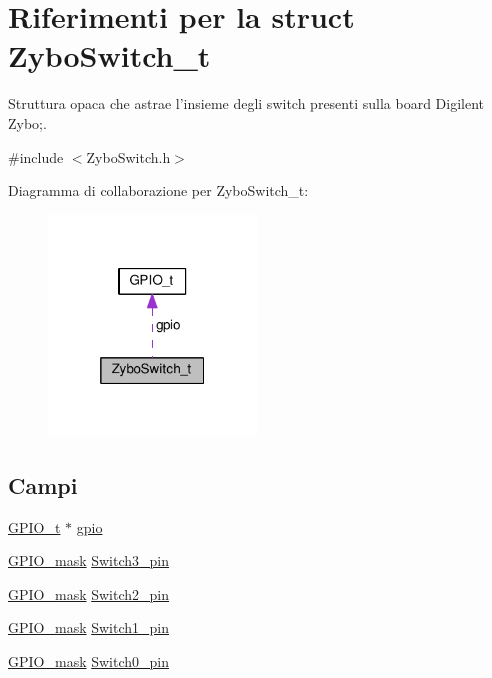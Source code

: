 \hypertarget{struct_zybo_switch__t}{\section{Riferimenti per la struct Zybo\+Switch\+\_\+t}
\label{struct_zybo_switch__t}
}


Struttura opaca che astrae l'insieme degli switch presenti sulla board Digilent Zybo;.  




{\ttfamily \#include $<$Zybo\+Switch.\+h$>$}



Diagramma di collaborazione per Zybo\+Switch\+\_\+t\+:\nopagebreak
\begin{figure}[H]
\begin{center}
\leavevmode
\includegraphics[width=157pt]{struct_zybo_switch__t__coll__graph}
\end{center}
\end{figure}
\subsection*{Campi}
\begin{DoxyCompactItemize}
\item 
\hyperlink{struct_g_p_i_o__t}{G\+P\+I\+O\+\_\+t} $\ast$ \hyperlink{struct_zybo_switch__t_acb3116190992a4d8d26545c103304d27}{gpio}
\item 
\hyperlink{group___g_p_i_o_ga6d5aef8a8a54ee2f602d47252ff66595}{G\+P\+I\+O\+\_\+mask} \hyperlink{struct_zybo_switch__t_a6b95420b88fe8c1fd7f347ce3ae1906b}{Switch3\+\_\+pin}
\item 
\hyperlink{group___g_p_i_o_ga6d5aef8a8a54ee2f602d47252ff66595}{G\+P\+I\+O\+\_\+mask} \hyperlink{struct_zybo_switch__t_a33eda4a0115ef585edd90078924ca56e}{Switch2\+\_\+pin}
\item 
\hyperlink{group___g_p_i_o_ga6d5aef8a8a54ee2f602d47252ff66595}{G\+P\+I\+O\+\_\+mask} \hyperlink{struct_zybo_switch__t_a6a3a5739e7e8f138241cafeeb7c1a33f}{Switch1\+\_\+pin}
\item 
\hyperlink{group___g_p_i_o_ga6d5aef8a8a54ee2f602d47252ff66595}{G\+P\+I\+O\+\_\+mask} \hyperlink{struct_zybo_switch__t_a5b7f83cd96441b7d1692710c6499147c}{Switch0\+\_\+pin}
\end{DoxyCompactItemize}


